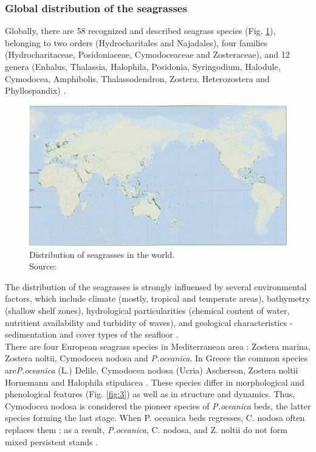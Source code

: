 \documentclass[10pt, a4paper]{article}
\begin{document}
\subsubsection{Global distribution of the seagrasses}
Globally, there are 58 recognized and described seagrass species (Fig. \ref{fig:2}), belonging to two orders
(Hydrocharitales and Najadales), four families (Hydrocharitaceae, Posidoniaceae, Cymodoceaceae
and Zosteraceae), and 12 genera (Enhalus, Thalassia, Halophila, Posidonia, Syringodium, Halodule,
Cymodocea, Amphibolis, Thalassodendron, Zostera, Heterozostera and Phyllospandix) \cite{Kuo89}\label{Kuo89}.
\begin{figure}
\centering
	\includegraphics[scale=0.25]{Fig-1-2.jpg}
	\caption{Distribution of seagrasses in the world.\\ Source:\cite{Green03}\label{Green03} \label{fig:2}} 
\end{figure}
The distribution of the seagrasses is strongly influensed by several environmental factors, which
include climate (mostly, tropical and temperate areas), bathymetry (shallow shelf zones), hydrological
particularities (chemical content of water, nutritient availability and turbidity of waves), and geological 
characteristics - sedimentation and cover types of the seafloor \cite{McKenzie06}\label{McKenzie06}.\\
There are four European seagrass species in Mediterranean area \cite{Borum04}\label{Borum04}: Zostera marina,
Zostera noltii, Cymodocea nodosa and \textit{P.oceanica}. In Greece the common species are\textit{P.oceanica}
(L.) Delile, Cymodocea nodosa (Ucria) Ascherson, Zostera noltii Hornemann and Halophila
stipulacea \cite{Amoutzopoulou-Schina05}\label{Amoutzopoulou-Schina05}. 
These species differ in morphological and
phenological features (Fig. \ref{fig:3}) as well as in structure and dynamics. Thus, Cymodocea nodosa is
considered the pioneer species of \textit{P.oceanica} beds, the latter species forming the last stage. When P.
oceanica beds regresses, C. nodosa often replaces them \cite{DenHartog77}\label{DenHartog77}; as a result, \textit{P.oceanica},
C. nodosa, and Z. noltii do not form mixed persistent stands \cite{Buia91}\label{Buia91}.
\end{document}
